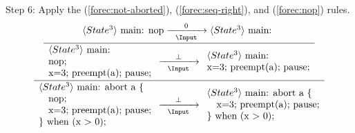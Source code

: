 \noindent
Step 6: Apply the (\ref{forec:not-aborted}), (\ref{forec:seq-right}), 
and (\ref{forec:nop}) rules. 
\begin{equation*}
	\frac{
		\dfrac{
				\langle State^3 \rangle ~ \text{main: nop}
					\xrightarrow[~~\Input~~]{0}
				 \langle State^3 \rangle ~ \text{main: }
			}{
				\begin{array}{l}
					\langle State^3 \rangle ~ \text{main:}	\\
					\text{nop;}								\\
					\text{x=3; preempt(a); pause;}							
				\end{array}
					\xrightarrow[~~\Input~~]{\bot} 
				\begin{array}{l}
					\langle State^3 \rangle ~ \text{main:}	\\
					\text{x=3; preempt(a); pause;}							
				\end{array}
			}
		}{
			\begin{array}{l}
				\langle State^3 \rangle ~ \text{main: abort a \{}	\\
				\text{~~~nop;}										\\
				\text{~~~x=3; preempt(a); pause;}					\\
				\text{\} when (x > 0);}
			\end{array}
				\xrightarrow[~~\Input~~]{\bot} 
			\begin{array}{l}
				\langle State^3 \rangle ~ \text{main: abort a \{}	\\
				\text{~~~x=3; preempt(a); pause;}					\\
				\text{\} when (x > 0);}
			\end{array}
		}
\end{equation*}

